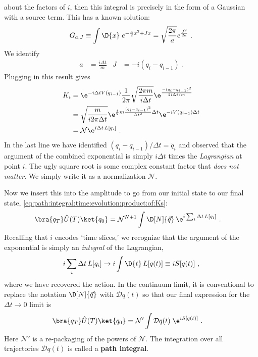 about the factors of $i$, then this integral is precisely in the form of a Gaussian with a source term. This has a known solution:
\begin{align}
    G_{a,J} \equiv \int \D{x}\; e^{-\frac{a}{2}x^2 + Jx} = \sqrt{\frac{2\pi}{a}}  e^{\frac{J^2}{2a}} \ .
\end{align}
We identify
\begin{align}
    a &= \frac{i\Delta t}{m}
    &
    J&= -i(q_i - q_{i-1}) \ .
\end{align}
Plugging in this result gives
\begin{align}
    K_i &=
    \e^{-i\Delta tV(q_{i-1})} 
    \frac{1}{2\pi}
    \sqrt{\frac{2\pi m}{i \Delta t}}
    \e^{\frac{-(q_i-q_{i-1})^2}{2i\Delta t/m}}
    \\
    &=
    \sqrt{\frac{m}{i 2\pi \Delta t}}
    \e^{\frac{i}{2}m\frac{(q_i-q_{i-1})^2}{\Delta t^2}\Delta t}
    \e^{-iV(q_{i-1})\Delta t} 
    \\
    &= \mathcal N \e^{i\Delta t\, L[q_i]}
    \label{eq:path:integral:infinitesmimal:kernel}
     \ .
\end{align}
In the last line we have identified $(q_i-q_{i-1})/\Delta t = \dot q_i$ and observed that the argument of the combined exponential is simply $i\Delta t$ times the \emph{Lagrangian} at point $i$. The ugly square root is some complex constant factor that \emph{does not matter}. We simply write it as a normalization $\mathcal N$. 

Now we insert this into the amplitude to go from our initial state to our final state, \eqref{eq:path:integral:time:evolution:product:of:Ks}:
\begin{align}
    \bra{q_T} \hat U(T) \ket{q_0} 
    &= \mathcal N^{N+1} \int \D[N]{\vec{q}} \,
    \e^{i \sum_i \Delta t\, L[q_i]} \ .
\end{align}
Recalling that $i$ encodes `time slices,' we recognize that the argument of the exponential is simply an \emph{integral} of the Lagrangian,
\begin{align}
    i \sum_i \Delta t\, L[q_i] \to i\int \D{t}\, L[q(t)] \equiv iS[q(t)] \ ,
\end{align}
where we have recovered the action. In the continuum limit, it is conventional to replace the notation $\D[N]{\vec{q}}$ with $\mathcal{D}q(t)$ so that our final expression for the $\Delta t \to 0$ limit is
\begin{align}
    \bra{q_T} \hat U(T) \ket{q_0} 
    &= \mathcal N' \int \mathcal{D}q(t)\;
    \e^{i S[q(t)]} \ .
    \label{eq:path:integral:formalism}
\end{align}
Here $\mathcal N'$ is a re-packaging of the powers of $\mathcal N$. The integration over all trajectories $\mathcal {D}q(t)$ is called a \textbf{path integral}.

